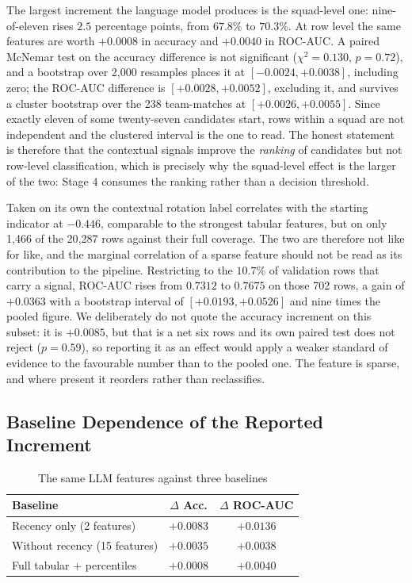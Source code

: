 \documentclass[conference]{IEEEtran}
\begin{document}
The largest increment the language model produces is the squad-level one: nine-of-eleven rises $2.5$ percentage points, from $67.8\%$ to $70.3\%$. At row level the same features are worth $+0.0008$ in accuracy and $+0.0040$ in ROC-AUC. A paired McNemar test on the accuracy difference is not significant ($\chi^{2} = 0.130$, $p = 0.72$), and a bootstrap over 2{,}000 resamples places it at $[-0.0024, +0.0038]$, including zero; the ROC-AUC difference is $[+0.0028, +0.0052]$, excluding it, and survives a cluster bootstrap over the 238 team-matches at $[+0.0026, +0.0055]$. Since exactly eleven of some twenty-seven candidates start, rows within a squad are not independent and the clustered interval is the one to read. The honest statement is therefore that the contextual signals improve the \emph{ranking} of candidates but not row-level classification, which is precisely why the squad-level effect is the larger of the two: Stage 4 consumes the ranking rather than a decision threshold.

Taken on its own the contextual rotation label correlates with the starting indicator at $-0.446$, comparable to the strongest tabular features, but on only 1{,}466 of the 20{,}287 rows against their full coverage. The two are therefore not like for like, and the marginal correlation of a sparse feature should not be read as its contribution to the pipeline. Restricting to the $10.7\%$ of validation rows that carry a signal, ROC-AUC rises from $0.7312$ to $0.7675$ on those 702 rows, a gain of $+0.0363$ with a bootstrap interval of $[+0.0193, +0.0526]$ and nine times the pooled figure. We deliberately do not quote the accuracy increment on this subset: it is $+0.0085$, but that is a net six rows and its own paired test does not reject ($p = 0.59$), so reporting it as an effect would apply a weaker standard of evidence to the favourable number than to the pooled one. The feature is sparse, and where present it reorders rather than reclassifies.

\subsection{Baseline Dependence of the Reported Increment}

\begin{table}[!t]
\centering
\small
\caption{The same LLM features against three baselines}
\label{tab:baseline_dep}
\begin{tabular}{@{}lcc@{}}
\toprule
\textbf{Baseline} & \textbf{$\Delta$ Acc.} & \textbf{$\Delta$ ROC-AUC} \\
\midrule
Recency only (2 features)      & $+0.0083$ & $+0.0136$ \\
Without recency (15 features)  & $+0.0035$ & $+0.0038$ \\
Full tabular $+$ percentiles   & $+0.0008$ & $+0.0040$ \\
\bottomrule
\end{tabular}
\end{table}
\end{document}
